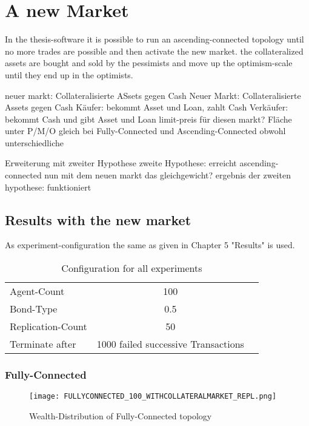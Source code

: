 \documentclass[Bachelorarbeit.tex]{subfiles}
\begin{document}
\graphicspath{{./figures/newMarket/}}	%

\chapter{A new Market}
In the thesis-software it is possible to run an ascending-connected topology until no more trades are possible and then activate the new market. the collateralized assets are bought and sold by the pessimists and move up the optimism-scale until they end up in the optimists.


neuer markt: Collateralisierte ASsets gegen Cash			
	Neuer Markt: Collateralisierte Assets gegen Cash
	Käufer: 		bekommt Asset und Loan, zahlt Cash
	Verkäufer: 		bekommt Cash und gibt Asset und Loan
	limit-preis für diesen markt?
	Fläche unter P/M/O gleich bei Fully-Connected und Ascending-Connected obwohl unterschiedliche

Erweiterung mit zweiter Hypothese
zweite Hypothese: erreicht ascending-connected nun mit dem neuen markt das gleichgewicht?
ergebnis der zweiten hypothese: funktioniert
		
\section{Results with the new market}	
As experiment-configuration the same as given in Chapter 5 "Results" is used.

\begin{table}[h]
	\centering
	\caption{Configuration for all experiments}
	\begin{tabular} { l c r }
		\hline
		Agent-Count & 100 \\
		Bond-Type & 0.5 \\
		Replication-Count & 50 \\
		Terminate after & 1000 failed successive Transactions \\
		\hline
	\end{tabular}
\end{table}

\subsection{Fully-Connected}
\begin{figure}[H]
	\centering
  \texttt{[image: FULLYCONNECTED\_100\_WITHCOLLATERALMARKET\_REPL.png]}
	\caption{Wealth-Distribution of Fully-Connected topology}
	\label{fig:wealth_FULLYCONNECTED_100_WITHCOLLATERALMARKET_REPL}
\end{figure}
\end{document}
